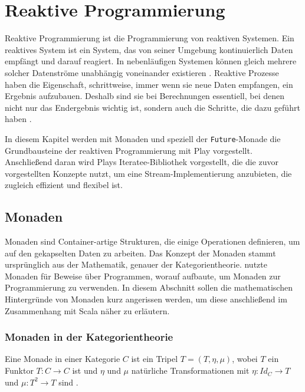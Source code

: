 
\chapter{Reaktive Programmierung} %
\label{cha:reaktive_programmierung}

Reaktive Programmierung ist die Programmierung von reaktiven Systemen.
Ein reaktives System ist ein System, das von seiner Umgebung kontinuierlich Daten empfängt und darauf reagiert.
In nebenläufigen Systemen können gleich mehrere solcher Datenströme unabhängig voneinander existieren \cite[vgl.][S.~1]{reactive_programming}.
Reaktive Prozesse haben die Eigenschaft, schrittweise, immer wenn sie neue Daten empfangen, ein Ergebnis aufzubauen.
Deshalb sind sie bei Berechnungen essentiell, bei denen nicht nur das Endergebnis wichtig ist, sondern auch die Schritte, die dazu geführt haben \cite[vgl.][S.~2]{reactive_programming1}.

In diesem Kapitel werden mit Monaden und speziell der \lstinline|Future|-Monade die Grundbausteine der reaktiven Programmierung mit Play vorgestellt.
Anschließend daran wird Plays Iteratee-Bibliothek vorgestellt, die die zuvor vorgestellten Konzepte nutzt, um eine Stream-Implementierung anzubieten, die zugleich effizient und flexibel ist.

\section{Monaden} %
\label{sec:monaden}

Monaden sind Container-artige Strukturen, die einige Operationen definieren, um auf den gekapselten Daten zu arbeiten.
Das Konzept der Monaden stammt ursprünglich aus der Mathematik, genauer der Kategorientheorie.
\citealt{monads_program_structure} nutzte Monaden für Beweise über Programmen, worauf \citealt{monads_programming} aufbaute, um Monaden zur Programmierung zu verwenden.
In diesem Abschnitt sollen die mathematischen Hintergründe von Monaden kurz angerissen werden, um diese anschließend im Zusammenhang mit Scala näher zu erläutern.

\subsection{Monaden in der Kategorientheorie} %
\label{sub:monaden_in_der_kategorientheorie}

Eine Monade in einer Kategorie $C$ ist ein Tripel $T = (T, \eta, \mu)$, wobei $T$ ein Funktor $T: C \to C$ ist und $\eta$ und $\mu$ natürliche Transformationen mit $\eta: Id_C \to T$ und $\mu: T^2 \to T$ sind \citetext{vgl.~\citealp[S.~137]{monads_category_theory}, \citealp[S.~2]{monads_program_structure}}.

